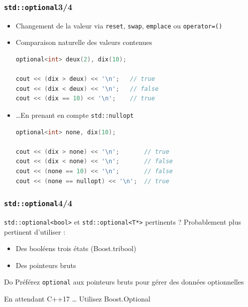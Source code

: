 \documentclass[C++.tex]{subfiles}
\begin{document}
\begin{frame}[fragile]
	\frametitle{\lstinline|std::optional|\titlehfill{}3/4}
	\begin{itemize}
		\item Changement de la valeur via \lstinline|reset|, \lstinline|swap|, \lstinline|emplace| ou \lstinline|operator=()|
		\item Comparaison naturelle des valeurs contenues 


		\begin{lstlisting}[language=C++]
optional<int> deux(2), dix(10);

cout << (dix > deux) << '\n';   // true	
cout << (dix < deux) << '\n';   // false
cout << (dix == 10) << '\n';    // true\end{lstlisting}

		\item \ldots En prenant en compte \lstinline|std::nullopt|

		\begin{lstlisting}[language=C++]
optional<int> none, dix(10);

cout << (dix > none) << '\n';       // true	
cout << (dix < none) << '\n';       // false
cout << (none == 10) << '\n';       // false
cout << (none == nullopt) << '\n';  // true\end{lstlisting}
	\end{itemize}
\end{frame}

\begin{frame}[fragile]
	\frametitle{\lstinline|std::optional|\titlehfill{}4/4}
	\begin{alertblock}{\lstinline|std::optional<bool>| et \lstinline|std::optional<T*>| pertinents ?}
		Probablement plus pertinent d'utiliser :
		\begin{itemize}
			\item Des booléens \og trois états\fg{} (Boost.tribool)
			\item Des pointeurs bruts
		\end{itemize}
	\end{alertblock}

	\begin{exampleblock}{Do}
		Préférez \lstinline|optional| aux pointeurs bruts pour gérer des données optionnelles

	\end{exampleblock}

	\begin{block}{En attendant C++17 \ldots}
		Utilisez Boost.Optional
	\end{block}
\end{frame}
\end{document}
